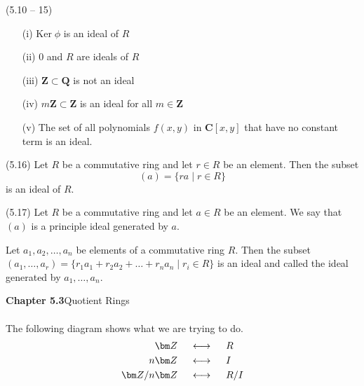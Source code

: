 \vspace{2ex}
\begin{ex}
(5.10 -- 15)
\begin{itemize}
\item[(i)] $\mathrm{Ker}\;\phi $ is an ideal of $R$
\item[(ii)] $0$ and $R$ are ideals of $R$
\item[(iii)] ${\bm Z}\subset {\bm Q}$ is not an ideal
\item[(iv)] $m{\bm Z}\subset {\bm Z}$ is an ideal for all $m\in {\bm Z}$
\item[(v)] The set of all polynomials $f(x,y)$ in ${\bm C}[x,y]$ that have no constant term is an ideal. 
\end{itemize}
\end{ex}
\vspace{2ex}
\begin{prop}
(5.16) Let $R$ be a commutative ring and let $r\in R$ be an element. Then the subset
\[(a)=\{ra \;|\; r\in R\}\]
is an ideal of $R$. 
\end{prop}
\vspace{2ex}
\begin{defi}
(5.17) Let $R$ be a commutative ring and let $a\in R$ be an element. We say that $(a)$ is a principle ideal generated by $a$. 
\end{defi}
\vspace{2ex}
\begin{rmk}
Let $a_1,a_2,\ldots ,a_{n}$ be elements of a commutative ring $R$. Then the subset $(a_1,\ldots ,a_{r})=\{r_1a_1+r_2a_2+\ldots +r_{n}a_{n} \;|\;r_i\in R \}$ is an ideal and called the ideal generated by $a_1,\ldots ,a_{n}$.  
\end{rmk}
\vspace{2ex}
{\bf Chapter 5.3}\hspace{2ex}Quotient Rings
\\\\
The following diagram shows what we are trying to do.
\begin{align*}
{\bm Z}\hspace{3ex}&\longleftrightarrow \hspace{3ex}R\\
n{\bm Z}\hspace{3ex}&\longleftrightarrow\hspace{3ex} I\\
{\bm Z}/n{\bm Z}\hspace{3ex}&\longleftrightarrow\hspace{3ex} R/I
\end{align*}
